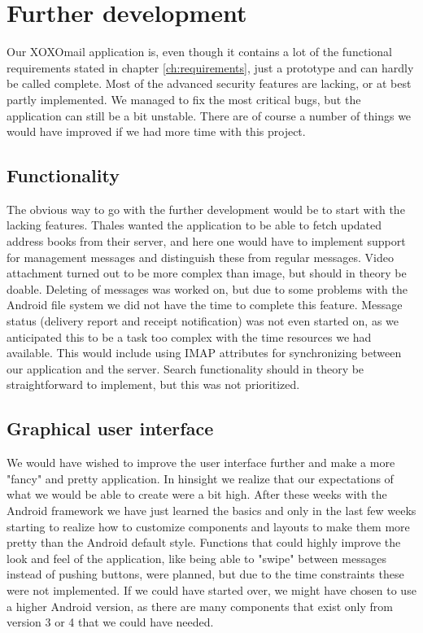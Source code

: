 \section{Further development}\label{con_further}

Our XOXOmail application is, even though it contains a lot of the functional requirements stated in chapter \ref{ch:requirements}, just a prototype and can hardly be called complete. Most of the advanced security features are lacking, or at best partly implemented. We managed to fix the most critical bugs, but the application can still be a bit unstable. There are of course a number of things we would have improved if we had more time with this project. 

\subsection{Functionality}
The obvious way to go with the further development would be to start with the lacking features. Thales wanted the application to be able to fetch updated address books from their server, and here one would have to implement support for management messages and distinguish these from regular messages. Video attachment turned out to be more complex than image, but should in theory be doable. Deleting of messages was worked on, but due to some problems with the Android file system we did not have the time to complete this feature. Message status (delivery report and receipt notification) was not even started on, as we anticipated this to be a task too complex with the time resources we had available. This would include using IMAP attributes for synchronizing between our application and the server. Search functionality should in theory be straightforward to implement, but this was not prioritized.

\subsection{Graphical user interface}
We would have wished to improve the user interface further and make a more "fancy" and pretty application. In hinsight we realize that our expectations of what we would be able to create were a bit high. After these weeks with the Android framework we have just learned the basics and only in the last few weeks 	starting to realize how to customize components and layouts to make them more pretty than the Android default style. Functions that could highly improve the look and feel of the application, like being able to "swipe" between messages instead of pushing buttons, were planned, but due to the time constraints these were not implemented. If we could have started over, we might have chosen to use a higher Android version, as there are many components that exist only from version 3 or 4 that we could have needed.


